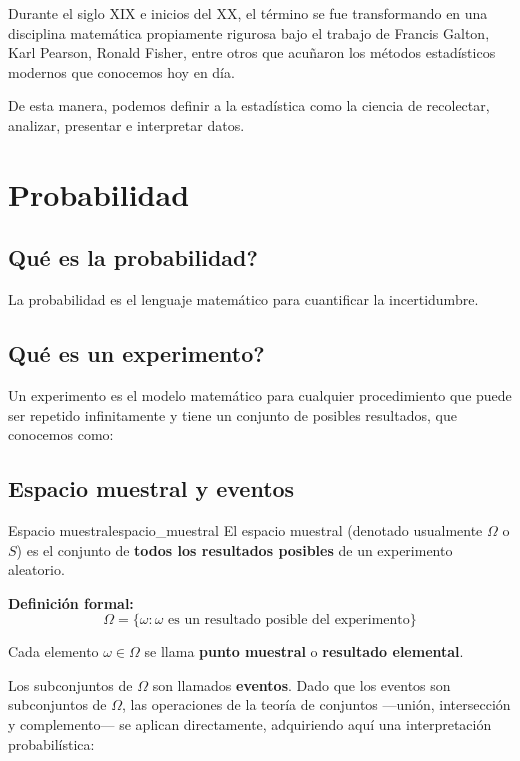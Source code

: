 \documentclass[12pt, a4paper]{book}
\numberwithin{equation}{chapter}
\begin{document}
Durante el siglo XIX e inicios del XX, el término se fue transformando en una disciplina matemática propiamente rigurosa bajo el trabajo de Francis Galton, Karl Pearson, Ronald Fisher, entre otros que acuñaron los métodos estadísticos modernos que conocemos hoy en día.

De esta manera, podemos definir a la estadística como la ciencia de recolectar, analizar, presentar e interpretar datos.



\chapter{Probabilidad}

\section{\textquestiondown Qu\'{e} es la probabilidad?}

La probabilidad es el lenguaje matemático para cuantificar la incertidumbre.


\section{\textquestiondown Qu\'{e} es un experimento?}

Un experimento es el modelo matemático para cualquier procedimiento que puede ser repetido infinitamente y tiene un conjunto de posibles resultados, que conocemos como:

\section{Espacio muestral y eventos}

\begin{definicion}{Espacio muestral}{espacio_muestral}
	El espacio muestral (denotado usualmente $\Omega$ o $S$) es el conjunto de \textbf{todos los resultados posibles} de un experimento aleatorio.
	
	\medskip
	\noindent\textbf{Definición formal:}
	\[
	\Omega = \{ \omega : \omega \text{ es un resultado posible del experimento} \}
	\]
	
	\medskip
	Cada elemento $\omega \in \Omega$ se llama \textbf{punto muestral} o \textbf{resultado elemental}.
\end{definicion}

Los subconjuntos de $\Omega$ son llamados \textbf{eventos}. Dado que los eventos son subconjuntos de $\Omega$, las operaciones de la teoría de conjuntos ---unión, intersección y complemento--- se aplican directamente, adquiriendo aquí una interpretación probabilística:
\end{document}
